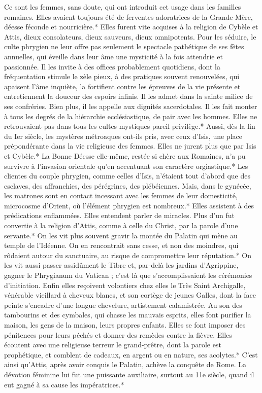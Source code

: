 \documentclass[a4paper, 11pt, oneside, polutonikogreek, french]{article}
\begin{document}
Ce sont les femmes, sans doute, qui ont introduit cet usage dans les familles romaines. Elles avaient toujours été de ferventes adoratrices de la Grande Mère, déesse féconde et nourricière.* Elles furent vite acquises à la religion de Cybèle et Attis, dieux consolateurs, dieux sauveurs, dieux omnipotents. Pour les séduire, le culte phrygien ne leur offre pas seulement le spectacle pathétique de ses fêtes annuelles, qui éveille dans leur âme une mysticité à la fois attendrie et passionnée. Il les invite à des offices probablement quotidiens, dont la fréquentation stimule le zèle pieux, à des pratiques souvent renouvelées, qui apaisent l'âme inquiète, la fortifient contre les épreuves de la vie présente et entretiennent la douceur des espoirs infinis. Il les admet dans la sainte milice de ses confréries. Bien plus, il les appelle aux dignités sacerdotales. Il les fait monter à tous les degrés de la hiérarchie ecclésiastique, de pair avec les hommes. Elles ne retrouvaient pas dans tous les cultes mystiques pareil privilège.* Aussi, dès la fin du Ier siècle, les mystères métroaques ont-ils pris, avec ceux d'Isis, une place prépondérante dans la vie religieuse des femmes. Elles ne jurent plus que par Isis et Cybèle.* La Bonne Déesse elle-même, restée si chère aux Romaines, n'a pu survivre à l'invasion orientale qu'en accentuant son caractère orgiastique.* Les clientes du couple phrygien, comme celles d'Isis, n'étaient tout d'abord que des esclaves, des affranchies, des pérégrines, des plébéiennes. Mais, dans le gynécée, les matrones sont en contact incessant avec les femmes de leur domesticité, microcosme d'Orient, où l'élément phrygien est nombreux.* Elles assistent à des prédications enflammées. Elles entendent parler de miracles. Plus d'un fut convertie à la religion d'Attis, comme à celle du Christ, par la parole d'une servante.* On les vit plus souvent gravir la montée du Palatin qui mène au temple de l'Idéenne. On en rencontrait sans cesse, et non des moindres, qui rôdaient autour du sanctuaire, au risque de compromettre leur réputation.* On les vit aussi passer assidûment le Tibre et, par-delà les jardins d'Agrippine, gagner le Phrygianum du Vatican ; c'est là que s'accomplissaient les cérémonies d'initiation. Enfin elles reçoivent volontiers chez elles le Très Saint Archigalle, vénérable vieillard à cheveux blancs, et son cortège de jeunes Galles, dont la face peinte s'encadre d'une longue chevelure, artistement calamistrée. Au son des tambourins et des cymbales, qui chasse les mauvais esprits, elles font purifier la maison, les gens de la maison, leurs propres enfants. Elles se font imposer des pénitences pour leurs péchés et donner des remèdes contre la fièvre. Elles écoutent avec une religieuse terreur le grand-prêtre, dont la parole est prophétique, et comblent de cadeaux, en argent ou en nature, ses acolytes.* C'est ainsi qu'Attis, après avoir conquis le Palatin, achève la conquête de Rome. La dévotion féminine lui fut une puissante auxiliaire, surtout au 11e siècle, quand il eut gagné à sa cause les impératrices.*
\end{document}
